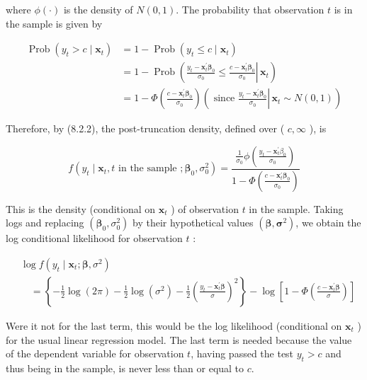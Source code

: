 \documentclass[10pt]{article}
\begin{document}
where $\phi(\cdot)$ is the density of $N(0,1)$. The probability that observation $t$ is in the sample is given by


\begin{align*}
\operatorname{Prob}\left(y_{t}>c \mid \mathbf{x}_{t}\right) & =1-\operatorname{Prob}\left(y_{t} \leq c \mid \mathbf{x}_{t}\right) \\
& =1-\operatorname{Prob}\left(\left.\frac{y_{t}-\mathbf{x}_{t}^{\prime} \boldsymbol{\beta}_{0}}{\sigma_{0}} \leq \frac{c-\mathbf{x}_{t}^{\prime} \boldsymbol{\beta}_{0}}{\sigma_{0}} \right\rvert\, \mathbf{x}_{t}\right) \\
& =1-\Phi\left(\frac{c-\mathbf{x}_{t}^{\prime} \boldsymbol{\beta}_{0}}{\sigma_{0}}\right)\left(\text { since } \left.\frac{y_{t}-\mathbf{x}_{t}^{\prime} \boldsymbol{\beta}_{0}}{\sigma_{0}} \right\rvert\, \mathbf{x}_{t} \sim N(0,1)\right) \tag{8.2.10}
\end{align*}


Therefore, by (8.2.2), the post-truncation density, defined over ( $c, \infty$ ), is


\begin{equation*}
f\left(y_{t} \mid \mathbf{x}_{t}, t \text { in the sample } ; \boldsymbol{\beta}_{0}, \sigma_{0}^{2}\right)=\frac{\frac{1}{\sigma_{0}} \phi\left(\frac{y_{t}-\mathbf{x}_{t}^{\prime} \beta_{0}}{\sigma_{0}}\right)}{1-\Phi\left(\frac{c-\mathbf{x}_{t}^{\prime} \boldsymbol{\beta}_{0}}{\sigma_{0}}\right)} \tag{8.2.11}
\end{equation*}


This is the density (conditional on $\mathbf{x}_{t}$ ) of observation $t$ in the sample. Taking logs and replacing $\left(\boldsymbol{\beta}_{0}, \sigma_{0}^{2}\right)$ by their hypothetical values $\left(\boldsymbol{\beta}, \boldsymbol{\sigma}^{2}\right)$, we obtain the log conditional likelihood for observation $t$ :


\begin{align*}
& \log f\left(y_{t} \mid \mathbf{x}_{t} ; \boldsymbol{\beta}, \sigma^{2}\right) \\
& \quad=\left\{-\frac{1}{2} \log (2 \pi)-\frac{1}{2} \log \left(\sigma^{2}\right)-\frac{1}{2}\left(\frac{y_{t}-\mathbf{x}_{t}^{\prime} \boldsymbol{\beta}}{\sigma}\right)^{2}\right\}-\log \left[1-\Phi\left(\frac{c-\mathbf{x}_{t}^{\prime} \boldsymbol{\beta}}{\sigma}\right)\right] \tag{8.2.12}
\end{align*}


Were it not for the last term, this would be the log likelihood (conditional on $\mathbf{x}_{t}$ ) for the usual linear regression model. The last term is needed because the value of the dependent variable for observation $t$, having passed the test $y_{t}>c$ and thus being in the sample, is never less than or equal to $c$.
\end{document}
